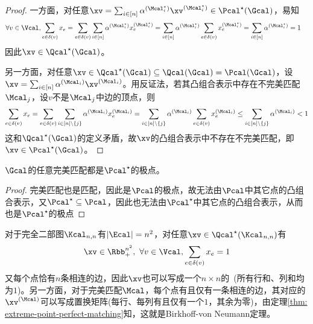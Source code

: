 \documentclass{ctexart}
\begin{document}
\begin{proof}
    一方面，对任意$\xv = \sum_{i \in [n]} \alpha^{(\Mcal_i^\star)} \xv^{(\Mcal_i^\star)} \in \Pcal^\star(\Gcal)$，易知
    \begin{align*}
        \forall v \in \Vcal, \sum_{e \in \delta(v)} x_e & = \sum_{e \in \delta(v)} \sum_{i \in [n]} \alpha^{(\Mcal_i^\star)} x^{(\Mcal_i^\star)}_e = \sum_{i \in [n]} \alpha^{(\Mcal_i^\star)} \sum_{e \in \delta(v)} x_e^{(\Mcal_i^\star)} = \sum_{i \in [n]} \alpha^{(\Mcal_i^\star)} = 1
    \end{align*}
    因此$\xv \in \Qcal^\star (\Gcal)$。

    另一方面，对任意$\xv \in \Qcal^\star(\Gcal) \subseteq \Qcal(\Gcal) = \Pcal(\Gcal)$，设$\xv = \sum_{i \in [n]} \alpha^{(\Mcal_i)} \xv^{(\Mcal_i)}$。用反证法，若其凸组合表示中存在不完美匹配$\Mcal_j$，设$v$不是$\Mcal_j$中边的顶点，则
    \begin{align*}
        \sum_{e \in \delta(v)} x_e = \sum_{e \in \delta(v)} \sum_{i \in [n] \setminus \{j\}} \alpha^{(\Mcal_i)} x_e^{(\Mcal_i)} = \sum_{i \in [n] \setminus \{j\}} \alpha^{(\Mcal_i)} \sum_{e \in \delta(v)} x_e^{(\Mcal_i)} \le \sum_{i \in [n] \setminus \{j\}} \alpha^{(\Mcal_i)} < 1
    \end{align*}
    这和$\Qcal^\star (\Gcal)$的定义矛盾，故$\xv$的凸组合表示中不存在不完美匹配，即$\xv \in \Pcal^\star (\Gcal)$。
\end{proof}

\begin{theorem} \label{thm: extreme-point-perfect-matching}
    $\Gcal$的任意完美匹配都是$\Pcal^\star$的极点。
\end{theorem}

\begin{proof}
    完美匹配也是匹配，因此是$\Pcal$的极点，故无法由$\Pcal$中其它点的凸组合表示，又$\Pcal^\star \subseteq \Pcal$，因此也无法由$\Pcal^\star$中其它点的凸组合表示，从而也是$\Pcal^\star$的极点
\end{proof}

对于完全二部图$\Kcal_{n,n}$有$|\Ecal| = n^2$，对任意$\xv \in \Qcal^\star(\Kcal_{n,n})$有
\begin{align*}
    \xv \in \Rbb_+^{n^2}, ~ \forall v \in \Vcal, \sum_{e \in \delta(v)} x_e = 1
\end{align*}
又每个点恰有$n$条相连的边，因此$\xv$也可以写成一个$n \times n$的~(所有行和、列和均为$1$)。另一方面，对于完美匹配$\Mcal$，每个点有且仅有一条相连的边，其对应的$\xv^{(\Mcal)}$可以写成置换矩阵(每行、每列有且仅有一个$1$，其余为零)，由定理\ref{thm: extreme-point-perfect-matching}知，这就是Birkhoff-von Neumann定理。
\end{document}
